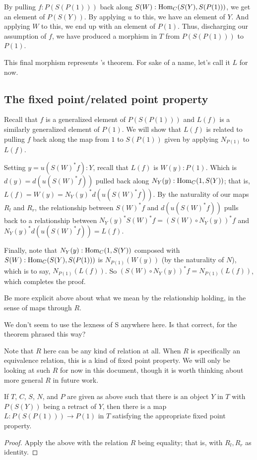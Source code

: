 By pulling $f :P(S(P(1)))$ back along $S(W) : \operatorname{Hom}_C(S(Y), S(P(1)))$, we get an element of $P(S(Y))$. By applying $u$ to this, we have an element of $Y$. And applying $W$ to this, we end up with an element of $P(1)$. Thus, discharging our assumption of $f$, we have produced a morphism in $T$ from $P(S(P(1)))$ to $P(1)$.

This final morphism represents \Loeb's theorem. For sake of a name, let's call it $L$ for now.

\subsection{The fixed point/related point property}
Recall that $f$ is a generalized element of $P(S(P(1)))$ and $L(f)$ is a similarly generalized element of $P(1)$. We will show that $L(f)$ is related to pulling $f$ back along the map from $1$ to $S(P(1))$ given by applying $N_{P(1)}$ to $L(f)$.

Setting $y = u(S(W)^* f) : Y$, recall that $L(f)$ is $W(y) : P(1)$. Which is $d(y) = d(u(S(W)^* f))$ pulled back along $N_Y(y) : \operatorname{Hom}_C(1, S(Y))$; that is, $L(f) = W(y) = N_Y(y)^* d(u(S(W)^* f))$. By the naturality of our maps $R_l$ and $R_r$, the relationship between $S(W)^*f$ and $d(u(S(W)^*f))$ pulls back to a relationship between $N_Y(y)^* S(W)^*f = (S(W) \circ N_Y(y))^* f$ and $N_Y(y)^* d(u(S(W)^*f)) = L(f)$.

Finally, note that $N_Y(y) : \operatorname{Hom}_C(1, S(Y))$ composed with $S(W) : \operatorname{Hom}_C(S(Y), S(P(1)))$ is $N_{P(1)}(W(y))$ (by the naturality of $N$), which is to say, $N_{P(1)}(L(f))$. So $(S(W) \circ N_Y(y))^* f = N_{P(1)}(L(f))$, which completes the proof.

\begin{TODOblock}
Be more explicit above about what we mean by the relationship holding, in the sense of maps through $R$.
\end{TODOblock}

\begin{TODOblock}
We don't seem to use the lexness of S anywhere here. Is that correct, for the theorem phrased this way?
\end{TODOblock}

Note that $R$ here can be any kind of relation at all. When $R$ is specifically an equivalence relation, this is a kind of fixed point property. We will only be looking at such $R$ for now in this document, though it is worth thinking about more general $R$ in future work.

\begin{corollary}\label{RetractInT}
If $T$, $C$, $S$, $N$, and $P$ are given as above such that there is an object $Y$ in $T$ with $P(S(Y))$ being a retract of $Y$, then there is a map $L : P(S(P(1))) \to P(1)$ in $T$ satisfying the appropriate fixed point property.
\end{corollary}
\begin{proof}
Apply the above with the relation $R$ being equality; that is, with $R_l, R_r$ as identity.
\end{proof}

